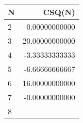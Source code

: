 \begin{table}[H]
    \centering
    \begin{tabular}{lr}
    \hline
    
        \textbf{ N }
        
           &
        
    
        \textbf{ CSQ(N) }
        
     
    \\
    \hline
    
        
            2
             
               &
            
        
            0.00000000000
            
        
        \\
    
        
            3
             
               &
            
        
            20.00000000000
            
        
        \\
    
        
            4
             
               &
            
        
            -3.33333333333
            
        
        \\
    
        
            5
             
               &
            
        
            -6.66666666667
            
        
        \\
    
        
            6
             
               &
            
        
            16.00000000000
            
        
        \\
    
        
            7
             
               &
            
        
            -0.00000000000
            
        
        \\
    
        
            8
             

\end{tabular}
\end{table}
